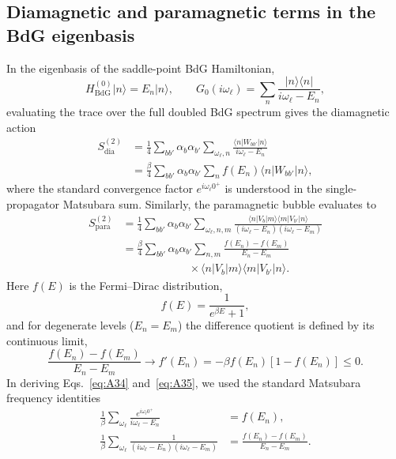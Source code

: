\documentclass[aps,prb,twocolumn,superscriptaddress,floatfix]{revtex4-2}
\begin{document}
\subsection{Diamagnetic and paramagnetic terms in the BdG eigenbasis}

In the eigenbasis of the saddle-point BdG Hamiltonian,
\begin{equation}
H_{\mathrm{BdG}}^{(0)} |n\rangle = E_n |n\rangle, \qquad G_0(i\omega_\ell) = \sum_n \frac{|n\rangle\langle n|}{i\omega_\ell - E_n},
\label{eq:A33}
\end{equation}
evaluating the trace over the full doubled BdG spectrum gives the diamagnetic action
\begin{equation}
\begin{aligned}
S_{\mathrm{dia}}^{(2)} &= \frac{1}{4}\sum_{bb'}\alpha_b \alpha_{b'} \sum_{\omega_\ell, n} \frac{\langle n|W_{bb'}|n\rangle}{i\omega_\ell - E_n} \\
&= \frac{\beta}{4}\sum_{bb'}\alpha_b \alpha_{b'} \sum_n f(E_n)\langle n|W_{bb'}|n\rangle,
\end{aligned}
\label{eq:A34}
\end{equation}
where the standard convergence factor $e^{i\omega_\ell 0^+}$ is understood in the single-propagator Matsubara sum. Similarly, the paramagnetic bubble evaluates to
\begin{equation}
\begin{aligned}
S_{\mathrm{para}}^{(2)} &= \frac{1}{4}\sum_{bb'}\alpha_b \alpha_{b'} \sum_{\omega_\ell, n, m} \frac{\langle n|V_b|m\rangle\langle m|V_{b'}|n\rangle}{(i\omega_\ell - E_n)(i\omega_\ell - E_m)} \\
&= \frac{\beta}{4}\sum_{bb'}\alpha_b \alpha_{b'} \sum_{n,m} \frac{f(E_n) - f(E_m)}{E_n - E_m} \\
&\qquad\qquad\qquad \times \langle n|V_b|m\rangle\langle m|V_{b'}|n\rangle.
\end{aligned}
\label{eq:A35}
\end{equation}
Here $f(E)$ is the Fermi--Dirac distribution,
\begin{equation}
f(E) = \frac{1}{e^{\beta E} + 1},
\label{eq:A36}
\end{equation}
and for degenerate levels ($E_n = E_m$) the difference quotient is defined by its continuous limit,
\begin{equation}
\frac{f(E_n) - f(E_m)}{E_n - E_m} \longrightarrow f'(E_n) = -\beta f(E_n)[1 - f(E_n)] \le 0.
\label{eq:A37}
\end{equation}
In deriving Eqs.~\eqref{eq:A34} and~\eqref{eq:A35}, we used the standard Matsubara frequency identities
\begin{align}
\frac{1}{\beta}\sum_{\omega_\ell} \frac{e^{i\omega_\ell 0^+}}{i\omega_\ell - E_n} &= f(E_n), \label{eq:A38} \\
\frac{1}{\beta}\sum_{\omega_\ell} \frac{1}{(i\omega_\ell - E_n)(i\omega_\ell - E_m)} &= \frac{f(E_n) - f(E_m)}{E_n - E_m}. \label{eq:A39}
\end{align}
\end{document}
